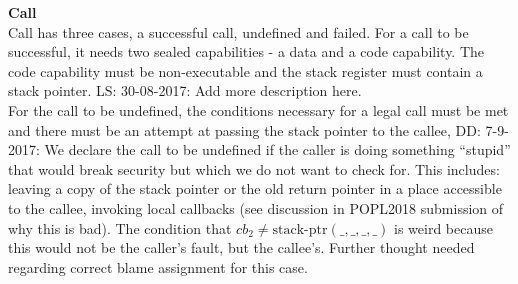 \documentclass[a4paper]{article}
\newcommand\lau[1]{{\color{purple} \sf \footnotesize {LS: #1}}\\}
\newcommand\dominique[1]{{\color{purple} \sf \footnotesize {DD: #1}}\\}
\newcommand{\stkptr}[1]{\mathrm{stack\text{-}ptr}(#1)}
\newcommand{\var}[1]{\mathit{#1}}
\newcommand{\cb}{\var{cb}}
\begin{document}
\textbf{Call}\\
Call has three cases, a successful call, undefined and failed. For a call to be successful, it needs two sealed capabilities - a data and a code capability. The code capability must be non-executable and the stack register must contain a stack pointer.
\lau{30-08-2017: Add more description here.}

For the call to be undefined, the conditions necessary for a legal call must be met and there must be an attempt at passing the stack pointer to the callee,
\dominique{7-9-2017: We declare the call to be undefined if the caller is doing something ``stupid'' that would break security but which we do not want to check for.  This includes: leaving a copy of the stack pointer or the old return pointer in a place accessible to the callee, invoking local callbacks (see discussion in POPL2018 submission of why this is bad).  The condition that $\cb_2 \neq \stkptr{\_,\_,\_,\_}$ is weird because this would not be the caller's fault, but the callee's.  Further thought needed regarding correct blame assignment for this case.}
\end{document}
